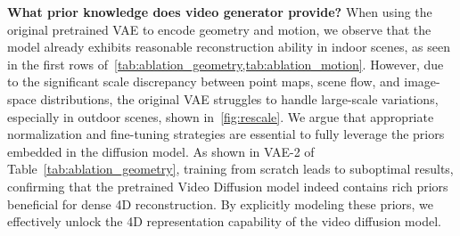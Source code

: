 \noindent
\textbf{What prior knowledge does video generator provide?}
When using the original pretrained VAE to encode geometry and motion,
we observe that the model already exhibits reasonable reconstruction ability in indoor scenes, as seen in the first rows of~\cref{tab:ablation_geometry,tab:ablation_motion}. 
However, due to the significant scale discrepancy between point maps, scene flow, and image-space distributions,
the original VAE struggles to handle large-scale variations, especially in outdoor scenes, shown in~\cref{fig:rescale}. 
We argue that appropriate normalization and fine-tuning strategies are essential to fully leverage the priors embedded in the diffusion model. 
As shown in VAE-2 of Table~\ref{tab:ablation_geometry}, 
training from scratch leads to suboptimal results, confirming that the pretrained Video Diffusion model indeed contains rich priors beneficial for dense 4D reconstruction. 
By explicitly modeling these priors, we effectively unlock the 4D representation capability of the video diffusion model.




